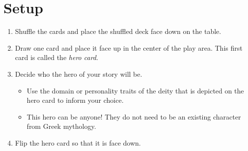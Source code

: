 \section*{Setup}

\begin{enumerate}[leftmargin=*]
\item Shuffle the cards and place the shuffled deck face down on the table.
\item Draw one card and place it face up in the center of the play area. This first card is called the \emph{hero card}.
\item Decide who the hero of your story will be.
\begin{itemize}[leftmargin=*]
\item Use the domain or personality traits of the deity that is depicted on the hero card to inform your choice.
\item This hero can be anyone! They do not need to be an existing character from Greek mythology.%
\end{itemize}
\item Flip the hero card so that it is face down.

\end{enumerate}